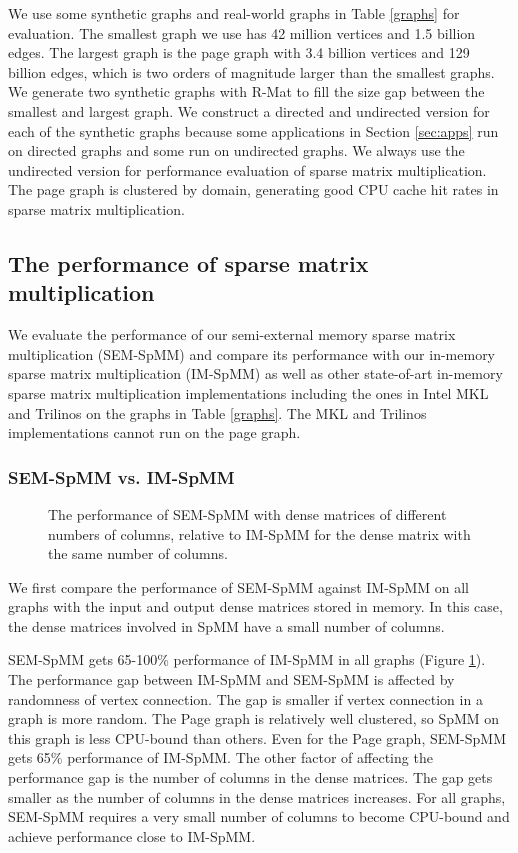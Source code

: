 We use some synthetic graphs and real-world graphs in Table \ref{graphs} for
evaluation. The smallest graph we use has 42 million vertices and 1.5 billion
edges. The largest graph is the page graph with 3.4 billion vertices
and 129 billion edges, which is two orders of magnitude larger than the smallest
graphs. We generate two synthetic graphs with R-Mat \cite{rmat} to fill the size
gap between the smallest and largest graph. We construct a directed and
undirected version for each of the synthetic graphs
because some applications in Section \ref{sec:apps} run on directed graphs
and some run on undirected graphs. We always use the undirected version for
performance evaluation of sparse matrix multiplication. The page graph is clustered
by domain, generating good CPU cache hit rates in sparse matrix multiplication.

\subsection{The performance of sparse matrix multiplication}

We evaluate the performance of our semi-external memory sparse matrix
multiplication (SEM-SpMM) and compare its performance with our in-memory sparse
matrix multiplication (IM-SpMM) as well as other state-of-art in-memory sparse
matrix multiplication implementations including the ones in Intel MKL and Trilinos
on the graphs in Table \ref{graphs}. The MKL and Trilinos implementations
cannot run on the page graph.

\subsubsection{SEM-SpMM vs. IM-SpMM}

\begin{figure}
	\begin{center}
		\footnotesize
		
		\caption{The performance of SEM-SpMM with dense matrices of different
			numbers of columns, relative to IM-SpMM for the dense matrix with
			the same number of columns.}
		\label{perf:spmm_comp}
	\end{center}
\end{figure}

We first compare the performance of SEM-SpMM against IM-SpMM on all graphs with
the input and output dense matrices stored in memory. In this case, the dense
matrices involved in SpMM have a small number of columns.

SEM-SpMM gets 65-100\% performance of IM-SpMM in all graphs (Figure
\ref{perf:spmm_comp}). The performance gap between IM-SpMM and SEM-SpMM
is affected by randomness of vertex connection. The gap is smaller if
vertex connection in a graph is more random. The Page graph is relatively
well clustered, so SpMM on this graph is less CPU-bound than others.
Even for the Page graph, SEM-SpMM gets 65\% performance of IM-SpMM.
The other factor of affecting the performance gap is the number of columns
in the dense matrices. The gap gets smaller as the number of columns in
the dense matrices increases. For all graphs, SEM-SpMM requires a very small
number of columns to become CPU-bound and achieve performance close to IM-SpMM.

